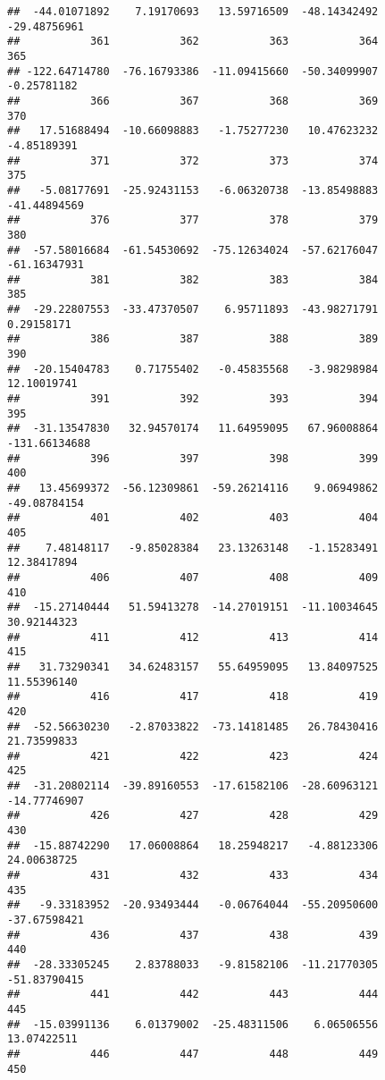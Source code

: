 \documentclass[
]{article}
\begin{document}
\begin{verbatim}
##  -44.01071892    7.19170693   13.59716509  -48.14342492  -29.48756961 
##           361           362           363           364           365 
## -122.64714780  -76.16793386  -11.09415660  -50.34099907   -0.25781182 
##           366           367           368           369           370 
##   17.51688494  -10.66098883   -1.75277230   10.47623232   -4.85189391 
##           371           372           373           374           375 
##   -5.08177691  -25.92431153   -6.06320738  -13.85498883  -41.44894569 
##           376           377           378           379           380 
##  -57.58016684  -61.54530692  -75.12634024  -57.62176047  -61.16347931 
##           381           382           383           384           385 
##  -29.22807553  -33.47370507    6.95711893  -43.98271791    0.29158171 
##           386           387           388           389           390 
##  -20.15404783    0.71755402   -0.45835568   -3.98298984   12.10019741 
##           391           392           393           394           395 
##  -31.13547830   32.94570174   11.64959095   67.96008864 -131.66134688 
##           396           397           398           399           400 
##   13.45699372  -56.12309861  -59.26214116    9.06949862  -49.08784154 
##           401           402           403           404           405 
##    7.48148117   -9.85028384   23.13263148   -1.15283491   12.38417894 
##           406           407           408           409           410 
##  -15.27140444   51.59413278  -14.27019151  -11.10034645   30.92144323 
##           411           412           413           414           415 
##   31.73290341   34.62483157   55.64959095   13.84097525   11.55396140 
##           416           417           418           419           420 
##  -52.56630230   -2.87033822  -73.14181485   26.78430416   21.73599833 
##           421           422           423           424           425 
##  -31.20802114  -39.89160553  -17.61582106  -28.60963121  -14.77746907 
##           426           427           428           429           430 
##  -15.88742290   17.06008864   18.25948217   -4.88123306   24.00638725 
##           431           432           433           434           435 
##   -9.33183952  -20.93493444   -0.06764044  -55.20950600  -37.67598421 
##           436           437           438           439           440 
##  -28.33305245    2.83788033   -9.81582106  -11.21770305  -51.83790415 
##           441           442           443           444           445 
##  -15.03991136    6.01379002  -25.48311506    6.06506556   13.07422511 
##           446           447           448           449           450 

\end{verbatim}
\end{document}
